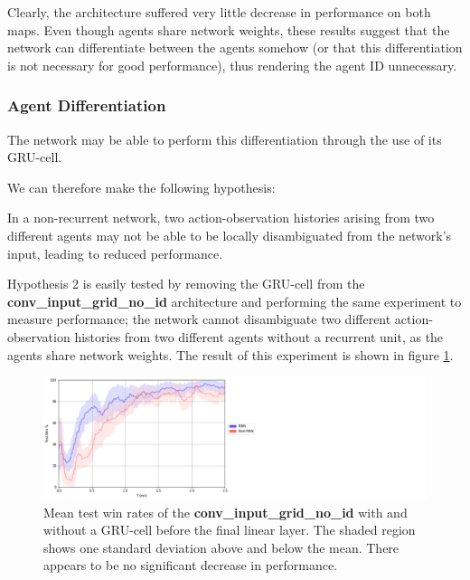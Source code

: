 Clearly, the architecture suffered very little decrease in performance on both maps. Even though agents share network weights, these results suggest that the network can differentiate between the agents somehow (or that this differentiation is not necessary for good performance), thus rendering the agent ID unnecessary. 


\subsubsection{Agent Differentiation}

The network may be able to perform this differentiation through the use of its GRU-cell.

We can therefore make the following hypothesis:

\begin{hyp} \label{hyp:second}
In a non-recurrent network, two action-observation histories arising from two different agents may not be able to be locally disambiguated from the network's input, leading to reduced performance.
\end{hyp}


Hypothesis 2 is easily tested by removing the GRU-cell from the \textbf{conv\_input\_grid\_no\_id} architecture and performing the same experiment to measure performance; the network cannot disambiguate two different action-observation histories from two different agents without a recurrent unit, as the agents share network weights. The result of this experiment is shown in figure \ref{fig:RNNvsnonRNN}.

\begin{figure}
    \centering
    \hbox{\hspace{5em}\includegraphics[scale=0.5]{images/graphs/RNN.png}}
    \caption{Mean test win rates of the \textbf{conv\_input\_grid\_no\_id} with and without a GRU-cell before the final linear layer. The shaded region shows one standard deviation above and below the mean. There appears to be no significant decrease in performance.}
    \label{fig:RNNvsnonRNN}
\end{figure}


